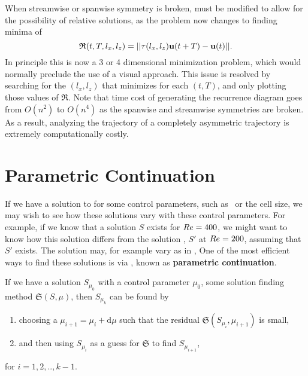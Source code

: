  When streamwise or spanwise symmetry is broken,  must be modified to allow for the possibility of relative solutions, as the problem now changes to finding minima of 
 \begin{equation}\label{eq:4DrecurrenceEQ}
 \mathfrak{R}(t,T,l_x,l_z) = ||\tau(l_x,l_z)\mathbf{u}(t+T) - \mathbf{u}(t)||.
  \end{equation}
   In principle this is now a 3 or 4 dimensional minimization problem, which would normally preclude the use of a visual approach. This issue is resolved by searching for the $(l_x,l_z)$ that minimizes  for each $(t,T)$, and only plotting those values of $\mathfrak{R}$. Note that time cost of generating the recurrence diagram goes from $O(n^2)$ to $O(n^4)$ as the spanwise and streamwise symmetries are broken. As a result, analyzing the trajectory of a completely asymmetric trajectory is extremely computationally costly.
 
 \section{Parametric Continuation} 
 
 If we have a solution to  for some control parameters, such as \ReN\ or the cell size, we may wish to see how these solutions vary with these control parameters. For example, if we know that a solution $S$  exists for $Re = 400$, we might want to know how this solution differs from the solution , $S'$ at $Re = 200$, assuming that $S'$ exists. The solution may, for example vary as in ,  One of the most efficient ways to find these solutions is via , known as {\bf parametric continuation}.
 \begin{algorithm}\label{alg:parCont}
 If we have a solution $S_{\mu_0}$ with a control parameter $\mu_0$,  some solution finding method $\mathfrak{S}(S,\mu)$, then $S_{\mu_k}$ can be found by
 \begin{enumerate}
 \item choosing a $\mu_{i+1} = \mu_{i} + \mathrm{d}\mu$ such that the residual $\mathfrak{S}(S_{\mu_{i}},\mu_{i+1})$ is small,
 \item and then using $S_{\mu_i}$ as a guess for $\mathfrak{S}$ to find $S_{\mu_{i+1}}$,
 \end{enumerate}
 for $i = 1,2,..,k-1$.
 \end{algorithm}

